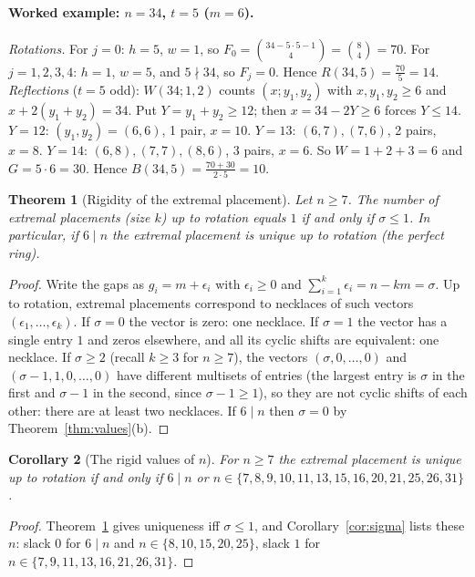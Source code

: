 \documentclass[11pt,a4paper]{article}
\newtheorem{theorem}{Theorem}[section]
\newtheorem{corollary}[theorem]{Corollary}
\theoremstyle{definition}
\theoremstyle{remark}
\begin{document}
\paragraph{Worked example: $n=34$, $t=5$ ($m=6$).} \emph{Rotations.} For $j=0$: $h=5$, $w=1$, so $F_0=\binom{34-5\cdot5-1}{4}=\binom84=70$. For $j=1,2,3,4$: $h=1$, $w=5$, and $5\nmid34$, so $F_j=0$. Hence $R(34,5)=\frac{70}5=14$.
\emph{Reflections} ($t=5$ odd): $W(34;1,2)$ counts $(x;y_1,y_2)$ with $x,y_1,y_2\ge6$ and $x+2(y_1+y_2)=34$. Put $Y=y_1+y_2\ge12$; then $x=34-2Y\ge6$ forces $Y\le14$.
$Y=12$: $(y_1,y_2)=(6,6)$, 1 pair, $x=10$. $Y=13$: $(6,7),(7,6)$, 2 pairs, $x=8$. $Y=14$: $(6,8),(7,7),(8,6)$, 3 pairs, $x=6$. So $W=1+2+3=6$ and $G=5\cdot6=30$.
Hence $B(34,5)=\frac{70+30}{2\cdot5}=10$.

\begin{theorem}[Rigidity of the extremal placement]\label{thm:rigid}
Let $n\ge7$. The number of extremal placements (size $k$) up to rotation equals $1$ if and only if $\sigma\le1$.
In particular, if $6\mid n$ the extremal placement is unique up to rotation (the perfect ring).
\end{theorem}
\begin{proof}
Write the gaps as $g_i=m+\epsilon_i$ with $\epsilon_i\ge0$ and $\sum_{i=1}^k\epsilon_i=n-km=\sigma$. Up to rotation, extremal placements correspond to necklaces of such vectors $(\epsilon_1,\dots,\epsilon_k)$.
If $\sigma=0$ the vector is zero: one necklace. If $\sigma=1$ the vector has a single entry $1$ and zeros elsewhere, and all its cyclic shifts are equivalent: one necklace.
If $\sigma\ge2$ (recall $k\ge3$ for $n\ge7$), the vectors $(\sigma,0,\dots,0)$ and $(\sigma-1,1,0,\dots,0)$ have different multisets of entries (the largest entry is $\sigma$ in the first and $\sigma-1$ in the second, since $\sigma-1\ge1$), so they are not cyclic shifts of each other: there are at least two necklaces.
If $6\mid n$ then $\sigma=0$ by Theorem~\ref{thm:values}(b).
\end{proof}

\begin{corollary}[The rigid values of $n$]\label{cor:rigidn}
For $n\ge7$ the extremal placement is unique up to rotation if and only if $6\mid n$ or $n\in\{7,8,9,10,11,13,15,16,20,21,25,26,31\}$.
\end{corollary}
\begin{proof}
Theorem~\ref{thm:rigid} gives uniqueness iff $\sigma\le1$, and Corollary~\ref{cor:sigma} lists these $n$: slack $0$ for $6\mid n$ and $n\in\{8,10,15,20,25\}$, slack $1$ for $n\in\{7,9,11,13,16,21,26,31\}$.
\end{proof}
\end{document}
